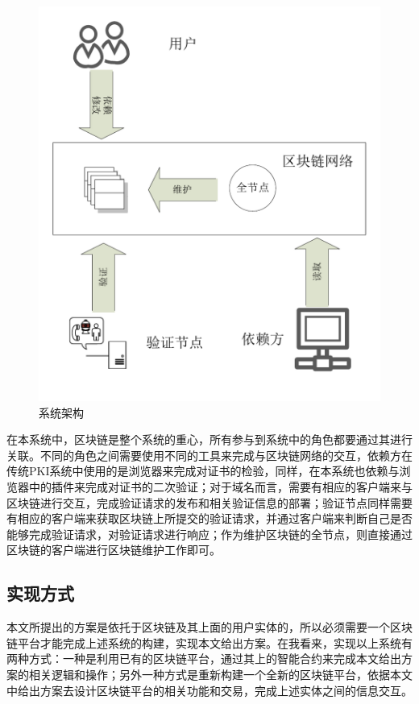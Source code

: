 \begin{figure}[htbp]
 	\centering
 	\includegraphics[scale=0.6]{img/system_framework}
 	\caption{系统架构}\label{fig:framework}
\end{figure}



在本系统中，区块链是整个系统的重心，所有参与到系统中的角色都要通过其进行关联。不同的角色之间需要使用不同的工具来完成与区块链网络的交互，依赖方在传统PKI系统中使用的是浏览器来完成对证书的检验，同样，在本系统也依赖与浏览器中的插件来完成对证书的二次验证；对于域名而言，需要有相应的客户端来与区块链进行交互，完成验证请求的发布和相关验证信息的部署；验证节点同样需要有相应的客户端来获取区块链上所提交的验证请求，并通过客户端来判断自己是否能够完成验证请求，对验证请求进行响应；作为维护区块链的全节点，则直接通过区块链的客户端进行区块链维护工作即可。

\subsection{实现方式}

本文所提出的方案是依托于区块链及其上面的用户实体的，所以必须需要一个区块链平台才能完成上述系统的构建，实现本文给出方案。在我看来，实现以上系统有两种方式：一种是利用已有的区块链平台，通过其上的智能合约来完成本文给出方案的相关逻辑和操作；另外一种方式是重新构建一个全新的区块链平台，依据本文中给出方案去设计区块链平台的相关功能和交易，完成上述实体之间的信息交互。

